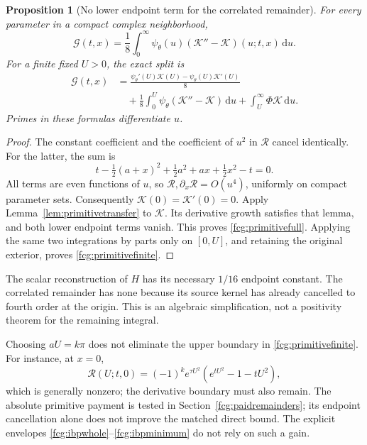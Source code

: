 \documentclass[11pt]{article}
\numberwithin{equation}{section}
\newtheorem{proposition}[theorem]{Proposition}
\newcommand{\dd}{\,\mathrm d}
\begin{document}
\begin{proposition}[No lower endpoint term for the correlated remainder]
\label{fcg:primitivecancellation}
For every parameter in a compact complex neighborhood,
\begin{equation}\label{fcg:primitivefull}
 \mathcal G(t,x)=\frac18\int_0^\infty
                  \psi_\theta(u)(\mathscr K''-\mathscr K)(u;t,x)\dd u.
\end{equation}
For a finite fixed $U>0$, the exact split is
\begin{align}
 \mathcal G(t,x)
 &=\frac{\psi_\theta'(U)\mathscr K(U)-\psi_\theta(U)\mathscr K'(U)}8\nonumber\\
 &\quad+\frac18\int_0^U\psi_\theta(\mathscr K''-\mathscr K)\dd u
   +\int_U^\infty\Phi\mathscr K\dd u.
 \label{fcg:primitivefinite}
\end{align}
Primes in these formulas differentiate $u$.
\end{proposition}
\begin{proof}
The constant coefficient and the coefficient of $u^2$ in
$\mathscr R$ cancel identically. For the latter, the sum is
\[
 t-\tfrac12(a+x)^2+\tfrac12a^2+ax+\tfrac12x^2-t=0.
\]
All terms are even functions of $u$, so
$\mathscr R,\partial_x\mathscr R=O(u^4)$, uniformly on compact
parameter sets. Consequently $\mathscr K(0)=\mathscr K'(0)=0$.
Apply Lemma~\ref{lem:primitivetransfer} to $\mathscr K$.
Its derivative growth satisfies that lemma, and both lower endpoint
terms vanish. This proves \eqref{fcg:primitivefull}.
Applying the same two integrations by parts only on $[0,U]$,
and retaining the original exterior, proves
\eqref{fcg:primitivefinite}.
\end{proof}

The scalar reconstruction of $H$ has its necessary $1/16$ endpoint
constant. The correlated remainder has none because its source kernel
has already cancelled to fourth order at the origin. This is an
algebraic simplification, not a positivity theorem for the remaining
integral.

Choosing $aU=k\pi$ does not eliminate the upper boundary in
\eqref{fcg:primitivefinite}. For instance, at $x=0$,
\[
 \mathscr R(U;t,0)=(-1)^k e^{\tau U^2}
                         (e^{tU^2}-1-tU^2),
\]
which is generally nonzero; the derivative boundary must also remain.
The absolute primitive payment is tested in
Section~\ref{fcg:paidremainders}; its endpoint cancellation alone
does not improve the matched direct bound. The explicit envelopes
\eqref{fcg:ibpwhole}--\eqref{fcg:ibpminimum} do not rely on such a gain.
\end{document}
